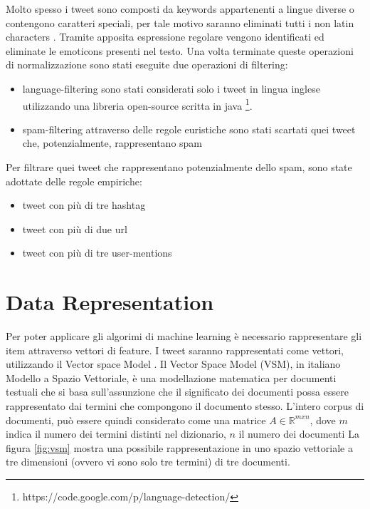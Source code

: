 Molto spesso i tweet sono composti da keywords appartenenti a lingue diverse o contengono caratteri speciali, per tale motivo saranno eliminati tutti i non latin characters \cite{DBLP:conf/msm/BellaachiaA14} . 
 Tramite apposita espressione regolare vengono identificati ed eliminate le emoticons presenti nel testo.
 Una volta terminate queste operazioni di normalizzazione sono stati eseguite due operazioni di filtering:
 \begin{itemize}
 \item language-filtering sono stati considerati solo i tweet in lingua inglese
 utilizzando una libreria open-source scritta in java \footnote{https://code.google.com/p/language-detection/}.
 \item spam-filtering attraverso delle regole euristiche sono stati scartati quei tweet che, potenzialmente, rappresentano spam
 \end{itemize}
 
  
 
Per filtrare  quei tweet che rappresentano potenzialmente dello spam, sono state adottate delle regole empiriche:   \cite{Benevenuto10detectingspammers}
    \begin{itemize}
	\item tweet con più di tre hashtag
	\item tweet con più di due url
	\item tweet con più di tre user-mentions
	\end{itemize}
 


\section{Data Representation} 
Per poter applicare gli algorimi di machine learning è necessario rappresentare gli item attraverso vettori di feature.
I tweet saranno rappresentati come vettori, utilizzando il Vector space Model \cite{Salton:1989:ATP:77013}. 
Il Vector Space Model (VSM), in italiano Modello a Spazio Vettoriale, è una modellazione matematica per documenti testuali che si basa sull'assunzione che il significato dei documenti possa essere rappresentato dai termini che compongono il documento stesso. 
L'intero corpus di documenti, può essere quindi considerato come una matrice $A \in \mathbb{R}^{mxn}$, dove $m$  indica il numero dei termini distinti nel dizionario, $n$  il numero dei documenti 
La figura \ref{fig:vsm}  mostra una possibile rappresentazione in uno spazio vettoriale a tre dimensioni (ovvero vi sono solo tre termini) di tre documenti.

